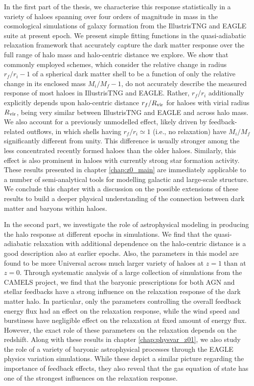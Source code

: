 \documentclass[a4paper, 12pt, oneside]{Thesis}  %
\begin{document}
{In the first part of the thesis, we characterise this response statistically in a variety of haloes spanning over four orders of magnitude in mass in the cosmological simulations of galaxy formation from the IllustrisTNG and EAGLE suite at present epoch. We present simple fitting functions in the quasi-adiabatic relaxation framework that accurately capture the dark matter response over the full range of halo mass and halo-centric distance we explore. We show that commonly employed schemes, which consider the relative change in radius $r_f/r_i-1$ of a spherical dark matter shell to be a function of only the relative change in its enclosed mass $M_i/M_f-1$, do not accurately describe the measured response of most haloes in IllustrisTNG and EAGLE. Rather, $r_f/r_i$ additionally explicitly depends upon halo-centric distance $r_f/R_{\rm vir}$ for haloes with virial radius $R_{\rm vir}$, being very similar between IllustrisTNG and EAGLE and across halo mass. We also account for a previously unmodelled effect, likely driven by feedback-related outflows, in which shells having $r_f/r_i\simeq1$ (i.e., no relaxation) have $M_i/M_f$ significantly different from unity. This difference is usually stronger among the less concentrated recently formed haloes than the older haloes. Similarly, this effect is also prominent in haloes with currently strong star formation activity. These results presented in chapter \ref{chap:z0_main} are immediately applicable to a number of semi-analytical tools for modelling galactic and large-scale structure. We conclude this chapter with a discussion on the possible extensions of these results to build a deeper physical understanding of the connection between dark matter and baryons within haloes.

In the second part, we investigate the role of astrophysical modeling in producing the halo response at different epochs in simulations. We find that the quasi-adiabatic relaxation with additional dependence on the halo-centric distance is a good description also at earlier epochs. Also, the parameters in this model are found to be more Universal across much larger variety of haloes at $z=1$ than at $z=0$. Through systematic analysis of a large collection of simulations from the CAMELS project, we find that the baryonic prescriptions for both AGN and stellar feedbacks have a strong influence on the relaxation response of the dark matter halo. In particular, only the parameters controlling the overall feedback energy flux had an effect on the relaxation response, while the wind speed and burstiness have negligible effect on the relaxation at fixed amount of energy flux. However, the exact role of these parameters on the relaxation depends on the redshift. Along with these results in chapter \ref{chap:physvar_z01}, we also study the role of a variety of baryonic astrophysical processes through the EAGLE physics variation simulations. While these depict a similar picture regarding the importance of feedback effects, they also reveal that the gas equation of state has one of the strongest influences on the relaxation response.

}
\end{document}
